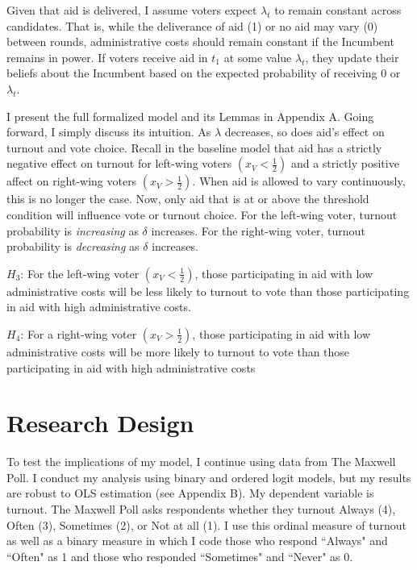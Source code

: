 \documentclass[12pt]{paper}
\begin{document}
Given that aid is delivered, I assume voters expect $\lambda_t$ to remain constant across candidates. That is, while the deliverance of aid (1) or no aid may vary (0) between rounds, administrative costs should remain constant if the Incumbent remains in power. If voters receive aid in $t_1$ at some value $\lambda_t$, they update their beliefs about the Incumbent based on the expected probability of receiving 0 or $\lambda_t$.

I present the full formalized model and its Lemmas in Appendix A. Going forward, I simply discuss its intuition. As $\lambda$ decreases, so does aid's effect on turnout and vote choice. Recall in the baseline model that aid has a strictly negative effect on turnout for left-wing voters $(x_V < \frac{1}{2})$ and a strictly positive affect on right-wing voters $(x_V > \frac{1}{2})$. When aid is allowed to vary continuously, this is no longer the case. Now, only aid that is at or above the threshold condition will influence vote or turnout choice. For the left-wing voter, turnout probability is \textit{increasing} as $\delta$ increases. For the right-wing voter, turnout probability is \textit{decreasing} as $\delta$ increases.

$H_3$: For the left-wing voter $(x_V < \frac{1}{2})$, those participating in aid with low administrative costs will be less likely to turnout to vote than those participating in aid with high administrative costs.

$H_4$: For a right-wing voter $(x_V > \frac{1}{2})$, those participating in aid with low administrative costs will be more likely to turnout to vote than those participating in aid with high administrative costs

\section{Research Design}
To test the implications of my model, I continue using data from The Maxwell Poll. I conduct my analysis using binary and ordered logit models, but my results are robust to OLS estimation (see Appendix B). My dependent variable is turnout. The Maxwell Poll asks respondents whether they turnout Always (4), Often (3), Sometimes (2), or Not at all (1). I use this ordinal measure of turnout as well as a binary measure in which I code those who respond ``Always" and ``Often" as 1 and those who responded ``Sometimes" and ``Never" as 0.
\end{document}
